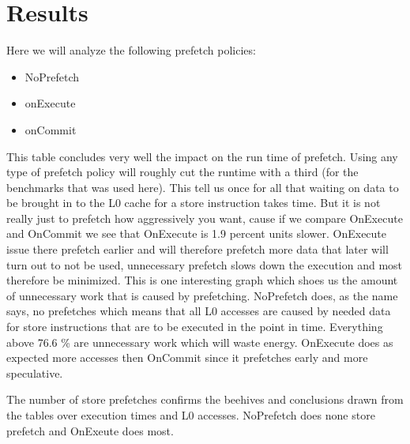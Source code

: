\chapter{Results}
\label{chap:results}


Here we will analyze the following prefetch policies:
\begin{itemize}
	\item NoPrefetch
	\item onExecute
	\item onCommit
\end{itemize}
\resExtime
{}
This table concludes very well the impact on the run time of prefetch. Using any type of prefetch policy will roughly cut the runtime with a third (for the benchmarks that was used here). This tell us once for all that waiting on data to be brought in to the L0 cache for a store instruction takes time. But it is not really just to prefetch how aggressively you want, cause if we compare OnExecute and OnCommit we see that OnExecute is 1.9 percent units slower. OnExecute issue there prefetch earlier and will therefore prefetch more data that later will turn out to not be used, unnecessary prefetch slows down the execution and most therefore be minimized.
\resAcc
{}
This is one interesting graph which shoes us the amount of unnecessary work that is caused by prefetching. NoPrefetch does, as the name says, no prefetches which means that all L0 accesses are caused by needed data for store instructions that are to be executed in the point in time. Everything above 76.6 \% are unnecessary work which will waste energy. OnExecute does as expected more accesses then OnCommit since it prefetches early and more speculative.

\resSp
{}
The number of store prefetches confirms the beehives and conclusions drawn from the tables over execution times and L0 accesses. NoPrefetch does none store prefetch and OnExeute does most.
\resEnergy
{}


